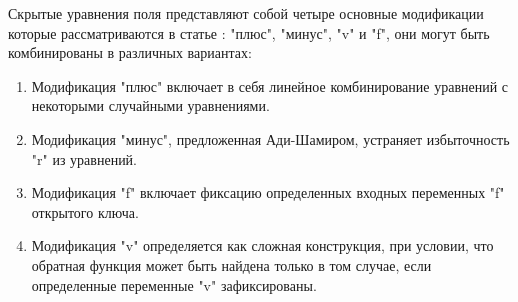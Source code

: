 \begin{comment}
Это приводит к следующей схеме шифрования с открытым ключом, которая завывается «уравнениями скрытого поля» (HFE).

\paragraph{Закрытый ключ.} Функция $f$, как мы рассматривали ранее, содержит две аффинные биекции $s$ и $t$, как указано выше, и некоторый способ представления $F{q^n}$ поверх $F_q$. Последний может быть закрытым, а может и не быть, поскольку изменение представления эквивалентно изменению $s$ или $t$; следовательно, мы можем предположить некоторый фиксированный способ представления $F{q^n}$.

\paragraph{Открытый ключ.} Многочлены $p_i$ для $i= 1,2,\ldots,n$ как указано выше, вычисляются с использованием секретного ключа $f , s, t$. Кроме того, $F_q$, степень расширения $n$ и способ добавления избыточности к сообщению является открытым.

\paragraph{Зафрование.} Чтобы зашифровать n-кратный $x = (x_1,\ldots,x_n) \in (F_q)^n$ (представляющий сообщение M плюс избыточность), вычислите зашифрованный текст по формуле:
\begin{equation}
    y=(p_1(x_1,\ldots,x_n),\ldots,p_n(x_1,x_2,\ldots,x_n)).
\end{equation}

\paragraph{Расшифрование.} Чтобы расшифровать зашифрованный текст $y$, сначала найдите все решения $z$ уравнения $f(z) = t^{-1}(y)$, затем вычислить все $s^-1(z)$ и, наконец, воспользуемся избыточностью, чтобы найти M из них.
\end{comment}

Скрытые уравнения поля представляют собой четыре основные модификации которые рассматриваются в статье \cite{hfe_variations}: "плюс", "минус", "v" и "f", они могут быть комбинированы в различных вариантах:

\begin{enumerate}
    \item Модификация "плюс" включает в себя линейное комбинирование уравнений с некоторыми случайными уравнениями.
    \item Модификация "минус", предложенная Ади-Шамиром, устраняет избыточность "r" из уравнений.
    \item Модификация "f" включает фиксацию определенных входных переменных "f" открытого ключа.
    \item Модификация "v" определяется как сложная конструкция, при условии, что обратная функция может быть найдена только в том случае, если определенные переменные "v" зафиксированы.
\end{enumerate}

